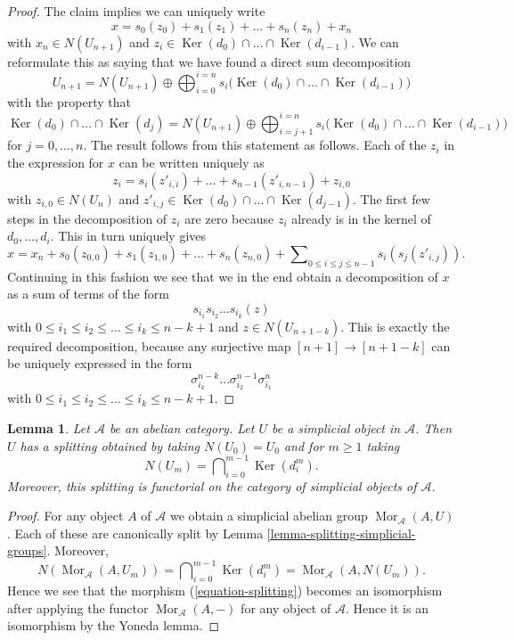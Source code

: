\documentclass{amsart}
\theoremstyle{plain}
\newtheorem{lemma}[subsection]{Lemma}
\theoremstyle{definition}
\theoremstyle{remark}
\numberwithin{equation}{subsection}
\def\Mor{\mathop{\mathrm{Mor}}\nolimits}
\def\Ker{\mathop{\mathrm{Ker}}}
\begin{document}
\begin{proof}
\medskip\noindent
The claim implies we can uniquely write
$$
x = s_0(z_0) + s_1(z_1) + \ldots + s_n(z_n) + x_n
$$
with $x_n \in N(U_{n + 1})$ and
$z_i \in \Ker(d_0) \cap \ldots \cap \Ker(d_{i - 1})$.
We can reformulate this as saying that we have found a direct
sum decomposition
$$
U_{n + 1}
=
N(U_{n + 1})
\oplus
\bigoplus\nolimits_{i = 0}^{i = n}
s_i\Big(\Ker(d_0) \cap \ldots \cap \Ker(d_{i - 1})\Big)
$$
with the property that
$$
\Ker(d_0) \cap \ldots \cap \Ker(d_j)
=
N(U_{n + 1}) \oplus
\bigoplus\nolimits_{i = j + 1}^{i = n}
s_i\Big(\Ker(d_0) \cap \ldots \cap \Ker(d_{i - 1})\Big)
$$
for $j = 0, \ldots, n$.
The result follows from this statement as follows.
Each of the $z_i$ in the expression for $x$
can be written uniquely as
$$
z_i = s_i(z'_{i, i}) + \ldots + s_{n - 1}(z'_{i, n - 1}) + z_{i, 0}
$$
with $z_{i, 0} \in N(U_n)$ and
$z'_{i, j} \in \Ker(d_0) \cap \ldots \cap \Ker(d_{j - 1})$.
The first few steps in the decomposition of $z_i$ are zero because
$z_i$ already is in the kernel of $d_0, \ldots, d_i$.
This in turn uniquely gives
$$
x = x_n + s_0(z_{0, 0}) + s_1(z_{1, 0}) + \ldots + s_n(z_{n, 0}) +
\sum\nolimits_{0 \leq i \leq j \leq n - 1} s_i(s_j(z'_{i, j})).
$$
Continuing in this fashion we see that we in the end obtain
a decomposition of $x$ as a sum of terms
of the form
$$
s_{i_1} s_{i_2} \ldots s_{i_k} (z)
$$
with $0 \leq i_1 \leq i_2 \leq \ldots \leq i_k \leq n - k + 1$ and
$z \in N(U_{n + 1 - k})$. This is exactly the required
decomposition, because any surjective map $[n + 1] \to [n + 1 - k]$
can be uniquely expressed in the form
$$
\sigma^{n - k}_{i_k} \ldots \sigma^{n - 1}_{i_2} \sigma^n_{i_1}
$$
with $0 \leq i_1 \leq i_2 \leq \ldots \leq i_k \leq n - k + 1$.
\end{proof}


\begin{lemma}
\label{lemma-splitting-abelian-category}
Let $\mathcal{A}$ be an abelian category.
Let $U$ be a simplicial object in $\mathcal{A}$.
Then $U$ has a splitting obtained by taking $N(U_0) = U_0$ and
for $m \geq 1$ taking
$$
N(U_m) = \bigcap\nolimits_{i = 0}^{m - 1} \Ker(d^m_i).
$$
Moreover, this splitting is functorial on the category of
simplicial objects of $\mathcal{A}$.
\end{lemma}

\begin{proof}
For any object $A$ of $\mathcal{A}$ we obtain
a simplicial abelian group $\Mor_\mathcal{A}(A, U)$.
Each of these are canonically split by Lemma
\ref{lemma-splitting-simplicial-groups}. Moreover,
$$
N(\Mor_\mathcal{A}(A, U_m)) =
\bigcap\nolimits_{i = 0}^{m - 1} \Ker(d^m_i) =
\Mor_\mathcal{A}(A, N(U_m)).
$$
Hence we see that the morphism (\ref{equation-splitting})
becomes an isomorphism after applying the functor
$\Mor_\mathcal{A}(A, -)$ for any object of $\mathcal{A}$.
Hence it is an isomorphism by the Yoneda lemma.
\end{proof}
\end{document}
